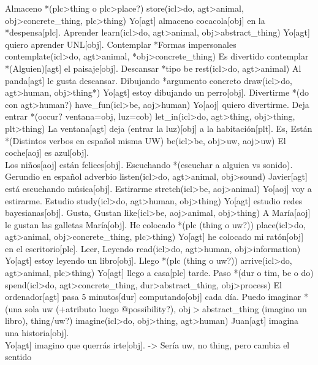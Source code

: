 \documentclass{article}
\begin{document}
{
    \uw
    {Almaceno *(plc>thing o plc>place?)}
    {store(icl>do, agt>animal, obj>concrete\_thing, plc>thing)}
    {Yo[agt] almaceno cocacola[obj] en la *despensa[plc].}
    \uw
    {Aprender}
    {learn(icl>do, agt>animal, obj>abstract\_thing)}
    {Yo[agt] quiero aprender UNL[obj].}
    \uw
    {Contemplar *Formas impersonales}
    {contemplate(icl>do, agt>animal, *obj>concrete\_thing)}
    {Es divertido contemplar *(Alguien)[agt] el paisaje[obj].}
    \uw
    {Descansar *tipo be}
    {rest(icl>do, agt>animal)}
    {Al panda[agt] le gusta descansar.}
    \uw
    {Dibujando *argumento concreto}
    {draw(icl>do, agt>human, obj>thing*)}
    {Yo[agt] estoy dibujando un perro[obj].}
    \uw
    {Divertirme *(do con agt>human?)}
    {have\_fun(icl>be, aoj>human)}
    {Yo[aoj] quiero divertirme.}
    \uw
    {Deja entrar *(occur? ventana=obj, luz=cob)}
    {let\_in(icl>do, agt>thing, obj>thing, plt>thing)}
    {La ventana[agt] deja (entrar la luz)[obj] a la habitación[plt].}
    \uw
    {Es, Están *(Distintos verbos en español misma UW)}
    {be(icl>be, obj>uw, aoj>uw)}
    {El coche[aoj] es azul[obj].\\
    Los niños[aoj] están felices[obj].}
    \uw
    {Escuchando *(escuchar a alguien vs sonido). Gerundio en español adverbio}
    {listen(icl>do, agt>animal, obj>sound)}
    {Javier[agt] está escuchando música[obj].}
    \uw
    {Estirarme}
    {stretch(icl>be, aoj>animal)}
    {Yo[aoj] voy a estirarme.}
    \uw
    {Estudio}
    {study(icl>do, agt>human, obj>thing)}
    {Yo[agt] estudio redes bayesianas[obj].}
    \uw
    {Gusta, Gustan}
    {like(icl>be, aoj>animal, obj>thing)}
    {A María[aoj] le gustan las galletas María[obj].}
    \uw
    {He colocado *(plc (thing o uw?))}
    {place(icl>do, agt>animal, obj>concrete\_thing, plc>thing)}
    {Yo[agt] he colocado mi ratón[obj] en el escritorio[plc].}
    \uw
    {Leer, Leyendo}
    {read(icl>do, agt>human, obj>information)}
    {Yo[agt] estoy leyendo un libro[obj].}
    \uw
    {Llego *(plc (thing o uw?))}
    {arrive(icl>do, agt>animal, plc>thing)}
    {Yo[agt] llego a casa[plc] tarde.}
    \uw
    {Paso *(dur o tim, be o do)}
    {spend(icl>do, agt>concrete\_thing, dur>abstract\_thing, obj>process)}
    {El ordenador[agt] pasa 5 minutos[dur] computando[obj] cada día.}
    \uw
    {Puedo imaginar *(una sola uw (+atributo luego @possibility?), obj$>$abstract\_thing (imagino un libro), thing/uw?)}
    {imagine(icl>do, obj>thing, agt>human)}
    {Juan[agt] imagina una historia[obj].\\
    Yo[agt] imagino que querrás irte[obj]. -> Sería uw, no thing, pero cambia el sentido}
}
\end{document}
